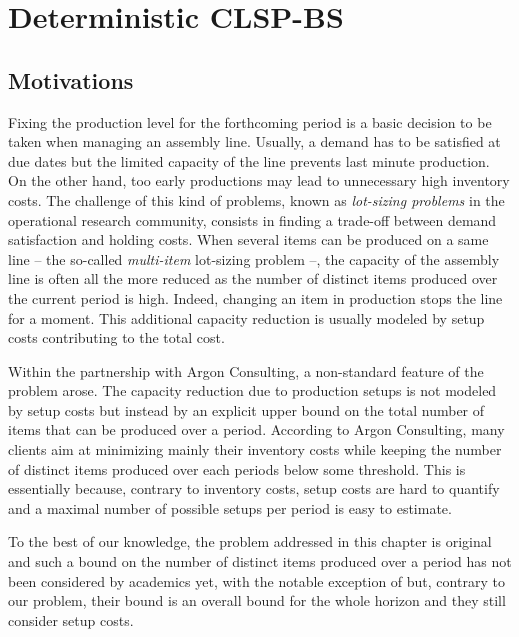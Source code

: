 \chapter{Deterministic CLSP-BS}
\label{chap:PDP - deterministic}


\section{Motivations}
\label{sec:PDP:Motivations}

Fixing the production level for the forthcoming period is a basic decision to be taken when managing an assembly line. Usually, a demand has to be satisfied at due dates but the limited capacity of the line prevents last minute production. On the other hand, too early productions may lead to unnecessary high inventory costs. The challenge of this kind of problems, known as {\em lot-sizing problems} in the operational research community, consists in finding a trade-off between demand satisfaction and holding costs.
When several items can be produced on a same line -- the so-called {\em multi-item} lot-sizing problem --, the capacity of the assembly line is often all the more reduced as the number of distinct items produced over the current period is high. Indeed, changing an item in production stops the line for a moment. This additional capacity reduction is usually modeled by setup costs contributing to the total cost.


Within the partnership with Argon Consulting, a non-standard feature of the problem arose. The capacity reduction due to production setups is not modeled by setup costs but instead by an explicit upper bound on the total number of items that can be produced over a period. According to Argon Consulting, many clients aim at minimizing mainly their inventory costs while keeping the number of distinct items produced over each periods below some threshold. This is essentially because, contrary to inventory costs, setup costs are hard to quantify and a maximal number of possible setups per period is easy to estimate.


To the best of our knowledge, the problem addressed in this chapter is original and such a bound on the number of distinct items produced over a period has not been considered by academics yet, with the notable exception of \cite{Rubaszewski2011} but, contrary to our problem, their bound is an overall bound for the whole horizon and they still consider setup costs.


\medskip

